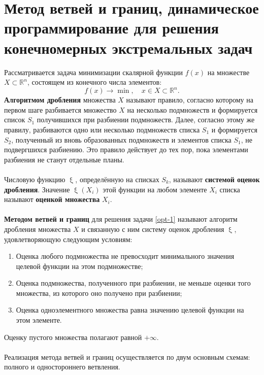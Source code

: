 \documentclass[a4paper, 12pt]{report}
\numberwithin{equation}{section}
\renewcommand{\xi}{\upxi}
\begin{document}
	\section{Метод ветвей и границ, динамическое программирование для решения конечномерных экстремальных задач}
	Рассматривается задача минимизации скалярной функции $f(x)$ на множестве $X \subset \mathbb{R}^n$, состоящем из конечного числа элементов:
	\begin{equation}
		\label{opt-1}
		f(x) \to \min, \quad x \in X \subset \mathbb{R}^n.
	\end{equation}
	\textbf{Алгоритмом дробления} множества $X$ называют правило, согласно которому на первом шаге разбивается множество $X$ на несколько подмножеств и формируется список $S_1$ получившихся при разбиении подмножеств. Далее, согласно этому же правилу, разбиваются одно или несколько подмножеств списка $S_1$ и формируется $S_2$, полученный из вновь образованных подмножеств и элементов списка $S_1$, не подвергшихся разбиению. Это правило действует до тех пор, пока элементами разбиения не станут отдельные планы.
	\\\\	
	Числовую функцию $\xi$, определённую на списках $S_k$, называют \textbf{системой оценок дробления}. Значение $\xi(X_i)$ этой функции на любом элементе $X_i$ списка называют \textbf{оценкой множества} $X_i$.
	\\\\
	\textbf{Методом ветвей и границ} для решения задачи \eqref{opt-1} называют алгоритм дробления множества $X$ и связанную с ним систему оценок дробления $\xi$, удовлетворяющую следующим условиям:
	\begin{enumerate}
		\item Оценка любого подмножества не превосходит минимального значения целевой функции на этом подмножестве;
		\item Оценка подмножества, полученного при разбиении, не меньше оценки того множества, из которого оно получено при разбиении;
		\item Оценка одноэлементного множества равна значению целевой функции на этом элементе.
	\end{enumerate}
	Оценку пустого множества полагают равной $+\infty$.
	\\\\
	Реализация метода ветвей и границ осуществляется по двум основным схемам: полного и одностороннего ветвления.
\end{document}
